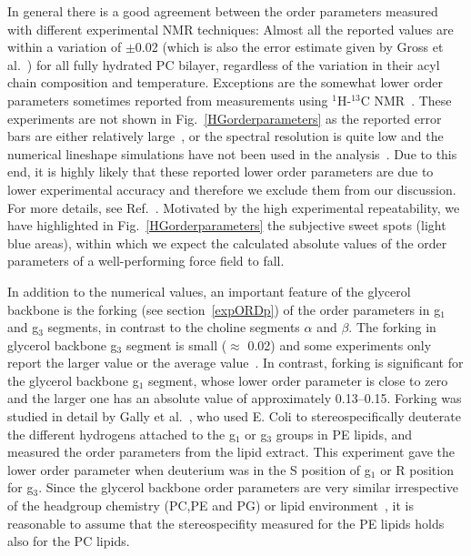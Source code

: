 \documentclass[journal=jacsat,manuscript=article]{achemso}
\begin{document}
In general there is a good agreement between the order parameters measured with different experimental NMR techniques: Almost all the 
reported values are within a variation of $\pm$0.02 (which is also the error estimate given by Gross et al.~\cite{gross97}) 
for all fully hydrated PC bilayer, regardless of the variation in their acyl chain composition and temperature.
Exceptions are the somewhat lower order parameters sometimes reported from measurements using $^1$H-$^{13}$C NMR~\cite{hong95a,hong95b,warschawski05}.
These experiments are not shown in Fig.~\ref{HGorderparameters} as the reported error bars are either relatively large~\cite{hong95a,hong95b}, 
or the spectral resolution is quite low and the numerical lineshape simulations have not been used in the analysis~\cite{warschawski05}.
Due to this end, it is highly likely that these reported lower order parameters are due to lower experimental 
accuracy and therefore we exclude them from our discussion. 
For more details, see Ref.~. 
Motivated by the high experimental repeatability, we have highlighted in 
Fig.~\ref{HGorderparameters} the subjective sweet spots (light blue areas), within which we expect the calculated absolute 
values of the order parameters of a well-performing force field to fall.


In addition to the numerical values, an important feature of the glycerol backbone is the 
forking (see section~\ref{expORDp}) of the order parameters in g$_1$ and g$_3$ segments, in contrast to the choline segments $\alpha$ and $\beta$. 
The forking in glycerol backbone g$_3$ segment is small ($\approx$ 0.02) 
and some experiments only report the larger value or the average value~\cite{akutsu81,ferreira13}. 
In contrast, forking is significant for the glycerol backbone g$_1$ segment, whose lower order parameter is close to zero and the
larger one has an absolute value of approximately 0.13--0.15. Forking was studied in detail by Gally et al.~\cite{gally81}, who used E. Coli to 
stereospecifically deuterate the different hydrogens attached to the g$_1$ or g$_3$ groups in PE lipids, and measured the order parameters from the lipid 
extract. This experiment gave the lower order parameter when deuterium was in the S position of g$_1$ or R position for g$_3$.
Since the glycerol backbone order parameters are very similar irrespective of the headgroup chemistry (PC,PE and PG) or lipid 
environment~\cite{gally81}, it is reasonable to assume that the stereospecifity measured for the PE lipids
holds also for the PC lipids.
\end{document}
